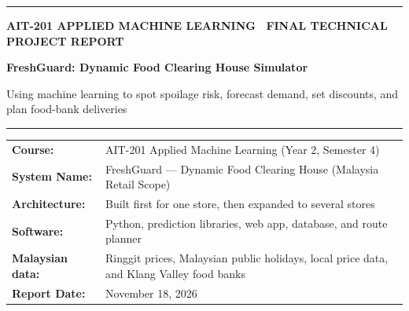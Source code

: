 \documentclass[12pt,a4paper]{article}
\renewcommand{\_}{\oldunderscore\allowbreak}
\begin{document}
\begin{titlepage}
    \thispagestyle{empty}
    \vspace*{1mm}
    {\color{RoyalAccent}\rule{\textwidth}{2.2pt}}
    \vspace{4mm}

    {\small\bfseries\color{TealAccent}\uppercase{AIT-201 Applied Machine Learning \textbullet\ Final Technical Project Report}}

    \vspace{3mm}
    {\Huge\bfseries\color{NavyPrimary}FreshGuard: Dynamic Food Clearing House Simulator\par}
    \vspace{2.5mm}
    {\large\color{SlateDark}Using machine learning to spot spoilage risk, forecast demand, set discounts, and plan food-bank deliveries\par}

    \vspace{4mm}
    {\color{BorderGray}\rule{\textwidth}{0.8pt}}
    \vspace{4mm}

    \begin{tcolorbox}[
        colback=LightBg,
        colframe=BorderGray,
        boxrule=0.7pt,
        arc=3pt,
        top=7pt, bottom=7pt, left=10pt, right=10pt
    ]
        \renewcommand{\arraystretch}{1.15}
        {\small
        \begin{tabularx}{\textwidth}{@{} >{\bfseries\color{NavyPrimary}}l >{\raggedright\arraybackslash}X @{}}
            Course:          & AIT-201 Applied Machine Learning (Year 2, Semester 4) \\
            System Name:     & FreshGuard --- Dynamic Food Clearing House (Malaysia Retail Scope) \\
            Architecture:    & Built first for one store, then expanded to several stores \\
            Software:        & Python, prediction libraries, web app, database, and route planner \\
            Malaysian data:  & Ringgit prices, Malaysian public holidays, local price data, and Klang Valley food banks \\
            Report Date:     & November 18, 2026 \\
        \end{tabularx}}
    \end{tcolorbox}


\end{titlepage}
\end{document}
